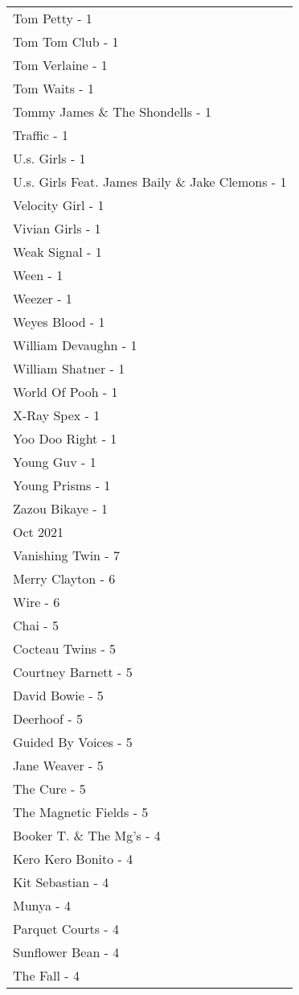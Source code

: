 \documentclass[
]{article}
\begin{document}
\begin{longtable}{l}
Tom Petty - 1 \\ 
Tom Tom Club - 1 \\ 
Tom Verlaine - 1 \\ 
Tom Waits - 1 \\ 
Tommy James \& The Shondells - 1 \\ 
Traffic - 1 \\ 
U.s. Girls - 1 \\ 
U.s. Girls Feat. James Baily \& Jake Clemons - 1 \\ 
Velocity Girl - 1 \\ 
Vivian Girls - 1 \\ 
Weak Signal - 1 \\ 
Ween - 1 \\ 
Weezer - 1 \\ 
Weyes Blood - 1 \\ 
William Devaughn - 1 \\ 
William Shatner - 1 \\ 
World Of Pooh - 1 \\ 
X-Ray Spex - 1 \\ 
Yoo Doo Right - 1 \\ 
Young Guv - 1 \\ 
Young Prisms - 1 \\ 
Zazou Bikaye - 1 \\ 
\midrule
\multicolumn{1}{l}{Oct 2021} \\ 
\midrule
Vanishing Twin - 7 \\ 
Merry Clayton - 6 \\ 
Wire - 6 \\ 
Chai - 5 \\ 
Cocteau Twins - 5 \\ 
Courtney Barnett - 5 \\ 
David Bowie - 5 \\ 
Deerhoof - 5 \\ 
Guided By Voices - 5 \\ 
Jane Weaver - 5 \\ 
The Cure - 5 \\ 
The Magnetic Fields - 5 \\ 
Booker T. \& The Mg's - 4 \\ 
Kero Kero Bonito - 4 \\ 
Kit Sebastian - 4 \\ 
Munya - 4 \\ 
Parquet Courts - 4 \\ 
Sunflower Bean - 4 \\ 
The Fall - 4 \\ 

\end{longtable}
\end{document}
